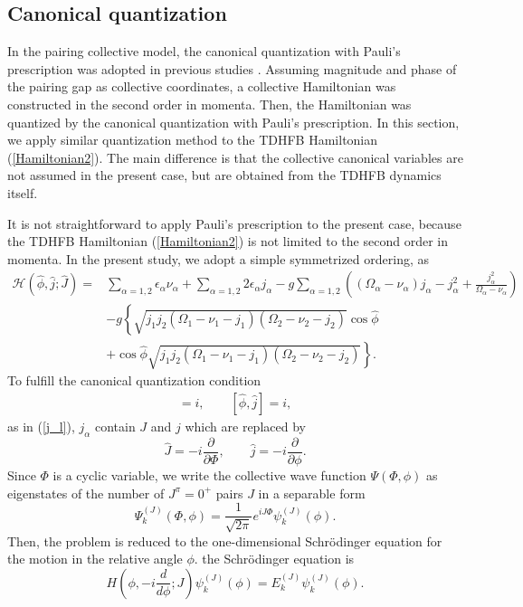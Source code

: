 \documentclass[11pt]{book} %
\begin{document}
\subsection{Canonical quantization}
\label{sec:canonical}
In the pairing collective model, the canonical quantization with Pauli's prescription
was adopted in previous studies \cite{BBPK70,GPBW85, ZPPRS99, P07}.
Assuming magnitude and phase of the pairing gap as collective coordinates,
a collective Hamiltonian was constructed in the second order in momenta.
Then, the Hamiltonian was quantized by the canonical quantization
with Pauli's prescription.
In this section, we apply similar quantization method to
the TDHFB Hamiltonian (\ref{Hamiltonian2}).
The main difference is that the collective canonical variables are
not assumed in the present case, but are obtained from the TDHFB dynamics
itself.\par
It is not straightforward to apply Pauli's prescription
to the present case, 
because the TDHFB Hamiltonian (\ref{Hamiltonian2})
is not limited to the second order in momenta.
In the present study, 
we adopt a simple symmetrized ordering, as
\begin{align}
	\mathcal{H}(\hat{\phi},\hat{j};\hat{J})
	=& \sum_{\alpha=1,2} \epsilon_{\alpha}\nu_{\alpha} + \sum_{\alpha=1,2} 2\epsilon_{\alpha}j_{\alpha} - g\sum_{\alpha=1,2} \left( (\Omega_{\alpha}-\nu_{\alpha}) j_{\alpha} - j_{\alpha}^2 +\frac{j_{\alpha}^2}{\Omega_{\alpha}-\nu_{\alpha}} \right) \nonumber \\
	&- g \left\{ \sqrt{j_1j_2(\Omega_{1}-\nu_{1}-j_{1})(\Omega_{2}-\nu_{2}-j_{2})}\cos{\hat{\phi}} \right. \nonumber \\
	&\left. + \cos{\hat{\phi}}\sqrt{j_1j_2(\Omega_{1}-\nu_{1}-j_{1})(\Omega_{2}-\nu_{2}-j_{2})} \right\} .
\label{canonical_quantized_H}
\end{align}
To fulfill the canonical quantization condition
\begin{align}
 [\hat{\Phi},\hat{J}]=i, \quad\quad [\hat{\phi},\hat{j}]=i ,
\end{align}
as in (\ref{j_l}), $j_{\alpha}$ contain $J$ and $j$ which
are replaced by
\begin{equation}
	\hat{J} = -i\frac{\partial}{\partial\Phi},\quad\quad
	\hat{j} = -i\frac{\partial}{\partial\phi} .
\end{equation}
Since $\Phi$ is a cyclic variable, 
we write the collective wave function $\Psi(\Phi,\phi)$ as eigenstates
of the number of $J^{\pi}=0^+$ pairs $J$ in a separable form
\begin{equation}
  \Psi_k^{(J)}(\Phi,\phi) = 
	\frac{1}{\sqrt{2\pi}}e^{iJ\Phi}\psi_k^{(J)}(\phi) .
\end{equation}
Then, the problem is reduced to the one-dimensional Schr\"{o}dinger
equation for the motion in the relative angle $\phi$.
the Schr\"{o}dinger equation is
\begin{equation}
	H\left( \phi,-i\frac{d}{d\phi};J \right)
	\psi_k^{(J)}(\phi) = E_k^{(J)}\psi_k^{(J)}(\phi) .
	\label{Schroedinger_eq}
\end{equation}
\end{document}

